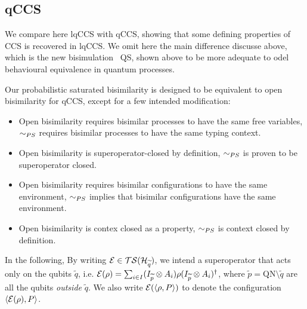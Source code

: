 \subsection{qCCS}
We compare here lqCCS with qCCS, showing that some defining properties of CCS is recovered in lqCCS. We omit here the main difference discusse above, which is the new bisimulation ~QS, shown above to be more adequate to odel behavioural equivalence in quantum processes.

Our probabilistic saturated bisimilarity is designed to be equivalent to open bisimilarity for qCCS, except for a few intended modification:\begin{itemize}
\item Open bisimilarity requires bisimilar processes to have the same free variables, $\sim_{PS}$ requires bisimilar processes to have the same typing context.
\item Open bisimilarity is superoperator-closed by definition, $\sim_{PS}$ is proven to be superoperator closed.
\item Open bisimilarity requires bisimilar configurations to have the same environment, $\sim_{PS}$ implies that bisimilar configurations have the same environment.
\item Open bisimilarity is contex closed as a property, $\sim_{PS}$ is context closed by definition.
\end{itemize}


In the following, By writing $\mathcal{E} \in \mathcal{TS}(\mathcal{H}_{\widetilde{q}})$, we intend a superoperator that acts only on the qubits $\widetilde{q}$, i.e. $\mathcal{E}(\rho) = \sum_{i \in I} (I_{\widetilde{p}} \otimes A_i) \rho (I_{\widetilde{p}} \otimes A_i)^{\dagger}$, where $\widetilde{p} = \text{QN} \setminus \widetilde{q}$ are all the qubits \textit{outside} $\widetilde{q}$. We also write $\mathcal{E}(\langle\rho, P\rangle)$ to denote the configuration $\langle\mathcal{E}(\rho), P\rangle$.

